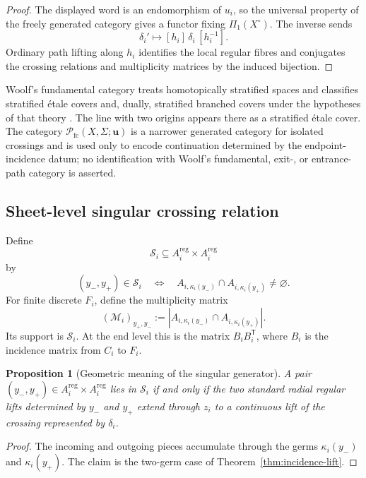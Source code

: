 \documentclass[11pt]{article}
\theoremstyle{plain}
\newtheorem{proposition}[theorem]{Proposition}
\theoremstyle{definition}
\begin{document}
\begin{proof}
The displayed word is an endomorphism of $u_i$, so the universal property
of the freely generated category gives a functor fixing
$\Pi_1(X^\circ)$.  The inverse sends
\[
\delta_i'\longmapsto
[h_i]\,\delta_i\,[h_i^{-1}].
\]
Ordinary path lifting along $h_i$ identifies the local regular fibres and
conjugates the crossing relations and multiplicity matrices by the induced
bijection.
\end{proof}

Woolf's fundamental category treats homotopically stratified spaces and
classifies stratified \mbox{\'etale} covers and, dually, stratified branched
covers under the hypotheses of that theory \citep{Woolf2009}.  The line with
two origins appears there as a stratified \mbox{\'etale} cover.  The category
$\mathcal P_{\mathrm{fc}}(X,\Sigma;\mathbf u)$ is a narrower generated category
for isolated crossings and is used only to encode continuation determined by
the endpoint-incidence datum; no identification with Woolf's fundamental,
exit-, or entrance-path category is asserted.

\subsection{Sheet-level singular crossing relation}
\label{subsec:sheet-level-crossings}

Define
\[
\mathcal S_i\subseteq A_i^{\mathrm{reg}}\times A_i^{\mathrm{reg}}
\]
by
\[
(y_-,y_+)\in\mathcal S_i
\quad\Longleftrightarrow\quad
A_{i,\kappa_i(y_-)}\cap A_{i,\kappa_i(y_+)}\neq\varnothing.
\]
For finite discrete $F_i$, define the multiplicity matrix
\[
(\mathcal M_i)_{y_+,y_-}
:=\left|A_{i,\kappa_i(y_-)}\cap A_{i,\kappa_i(y_+)}\right|.
\]
Its support is $\mathcal S_i$.  At the end level this is the matrix
$B_iB_i^{\mathsf T}$, where $B_i$ is the incidence matrix from $C_i$ to $F_i$.

\begin{proposition}[Geometric meaning of the singular generator]
\label{prop:crossing-relation-geometric}
A pair $(y_-,y_+)\in A_i^{\mathrm{reg}}\times A_i^{\mathrm{reg}}$ lies in
$\mathcal S_i$ if and only if the two standard radial regular lifts determined by
$y_-$ and $y_+$ extend through $z_i$ to a continuous lift of the crossing represented by
$\delta_i$.
\end{proposition}

\begin{proof}
The incoming and outgoing pieces accumulate through the germs
$\kappa_i(y_-)$ and $\kappa_i(y_+)$.  The claim is the two-germ case of
Theorem~\ref{thm:incidence-lift}.
\end{proof}
\end{document}
